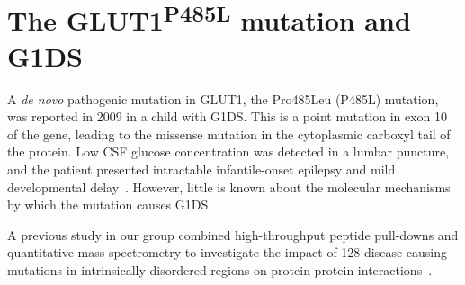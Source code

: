  \section{The GLUT1\textsuperscript{P485L} mutation and G1DS}

A \textit{de novo} pathogenic mutation in GLUT1, the Pro485Leu (P485L) mutation, was reported in 2009 in a child with G1DS. This is a point mutation in exon 10 of the gene, leading to the missense mutation in the cytoplasmic carboxyl tail of the protein. Low CSF glucose concentration was detected in a lumbar puncture, and the patient presented intractable infantile-onset epilepsy and mild developmental delay~\cite{Slaughter}. However, little is known about the molecular mechanisms by which the mutation causes G1DS.

A previous study in our group combined high-throughput peptide pull-downs and quantitative mass spectrometry to investigate the impact of 128 disease-causing mutations in intrinsically disordered regions on protein-protein interactions~\cite{Meyer2}. 




